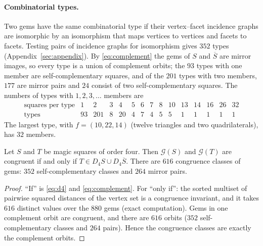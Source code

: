 \paragraph{Combinatorial types.}
Two gems have the same combinatorial type if their vertex--facet incidence graphs are isomorphic by an isomorphism that maps vertices to vertices and facets to facets.
Testing pairs of incidence graphs for isomorphism gives $352$ types (Appendix~\ref{sec:appendix}).
By \eqref{eq:complement} the gems of $S$ and $\overline S$ are mirror images, so every type is a union of complement orbits; the $93$ types with one member are self-complementary squares, and of the $201$ types with two members, $177$ are mirror pairs and $24$ consist of two self-complementary squares.
The numbers of types with $1,2,3,\dots$ members are
\[
\begin{array}{r|rrrrrrrrrrrrrr}
\text{squares per type} & 1&2&3&4&5&6&7&8&10&13&14&16&26&32\\\hline
\text{types} & 93&201&8&20&4&7&4&5&5&1&1&1&1&1
\end{array}
\]
The largest type, with $f=(10,22,14)$ (twelve triangles and two quadrilaterals), has $32$ members.

\begin{proposition}
\label{prop:congruence}
Let $S$ and $T$ be magic squares of order four. Then $\mathcal G(S)$ and $\mathcal G(T)$ are congruent if and only if $T\in D_4S\cup D_4\overline S$. There are $616$ congruence classes of gems: $352$ self-complementary classes and $264$ mirror pairs.
\end{proposition}

\begin{proof}
``If'' is \eqref{eq:d4} and \eqref{eq:complement}. For ``only if'': the sorted multiset of pairwise squared distances of the vertex set is a congruence invariant, and it takes $616$ distinct values over the $880$ gems (exact computation). Gems in one complement orbit are congruent, and there are $616$ orbits ($352$ self-complementary classes and $264$ pairs). Hence the congruence classes are exactly the complement orbits.
\end{proof}

